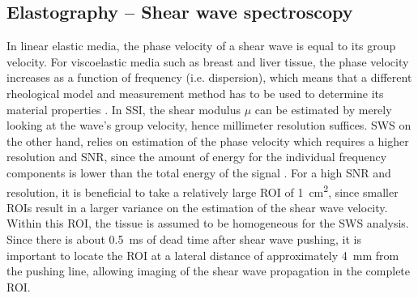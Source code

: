 \subsection{Elastography -- Shear wave spectroscopy}
\label{sec:us_sws} %
In linear elastic media, the phase velocity of a shear wave is equal to its group velocity. For viscoelastic media such as breast and liver tissue, the phase velocity increases as a function of frequency (i.e. dispersion), which means that a different rheological model and measurement method has to be used to determine its material properties \cite{minin_ultrafast_2011}. In SSI, the shear modulus $\mu$ can be estimated by merely looking at the wave's group velocity, hence millimeter resolution suffices. SWS on the other hand, relies on estimation of the phase velocity which requires a higher resolution and SNR, since the amount of energy for the individual frequency components is lower than the total energy of the signal \cite{deffieux_shear_2009}. For a high SNR and resolution, it is beneficial to take a relatively large ROI of \SI{1}{\centi\meter\squared}, since smaller ROIs result in a larger variance on the estimation of the shear wave velocity. Within this ROI, the tissue is assumed to be homogeneous for the SWS analysis. Since there is about \SI{0.5}{\milli\second} of dead time after shear wave pushing, it is important to locate the ROI at a lateral distance of approximately \SI{4}{\milli\meter} from the pushing line, allowing imaging of the shear wave propagation in the complete ROI. 


